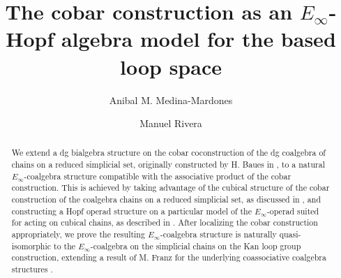 \documentclass{amsart}
\theoremstyle{definition}
\begin{document}
\title{The cobar construction as an $E_\infty$-Hopf algebra model for the based loop space}
\author{Anibal M. Medina-Mardones}
\address{Max Plank Institute for Mathematics, Bonn, Germany}
\address{Department of Mathematics, University of Notre Dame, Notre Dame, IN, USA}
\author{Manuel Rivera}
\address{Purdue University}


\begin{abstract}
    We extend a dg bialgebra structure on the cobar coconstruction of the dg coalgebra of chains on a reduced simplicial set, originally constructed by H. Baues in \cite{Baues}, to a natural $E_{\infty}$-coalgebra structure compatible with the associative product of the cobar construction. This is achieved by taking advantage of the cubical structure of the cobar construction of the coalgebra chains on a reduced simplicial set, as discussed in \cite{rivera-zeinalian-cubical}, and constructing a Hopf operad structure on a particular model of the $E_{\infty}$-operad suited for acting on cubical chains, as described in \cite{medina2021cubical}. After localizing the cobar construction appropriately, we prove the resulting $E_{\infty}$-coalgebra structure is naturally quasi-isomorphic to the $E_{\infty}$-coalgebra on the simplicial chains on the Kan loop group construction, extending a result of M. Franz for the underlying coassociative coalgebra structures \cite{franz}.
\end{abstract}
\end{document}
